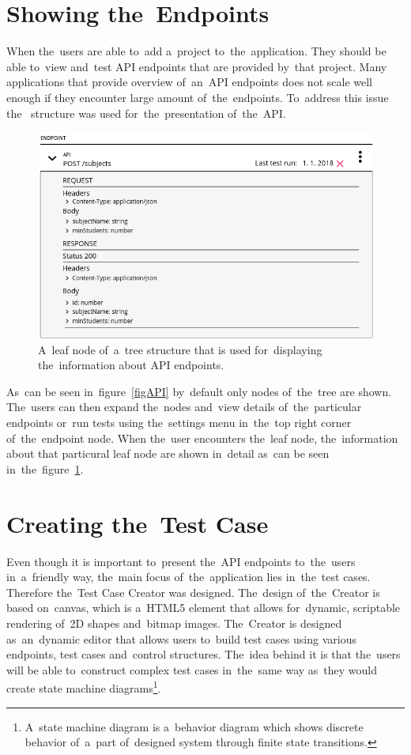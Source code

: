 \section{Showing the~Endpoints}
When the~users are able to~add a~project to~the~application. They should be able
to~view and~test API endpoints that are provided by~that project. Many
applications that provide overview of~an~API endpoints does not scale well
enough if they encounter large amount of~the~endpoints. To~address this issue
the~ structure was used for~the~presentation of~the~API.

\begin{figure}[!hbt]
	\centering
	\includegraphics[scale=0.62]{./designs/leafNode.png}
	\caption{A~leaf node of~a~tree structure that is used for~displaying
	the~information about API endpoints.}
	\label{figLeafNode}
\end{figure}

As~can be seen in~figure~\ref{figAPI} by~default only  nodes
of~the~tree are shown. The~users can then expand the~nodes and~view details
of~the~particular endpoints or~run tests using the~settings menu in~the~top
right corner of~the~endpoint node. When the~user encounters the~leaf node,
the~information about that particural leaf node are shown in~detail as~can be
seen in~the~figure~\ref{figLeafNode}. 

\section{Creating the~Test Case}
Even though it is important to~present the~API endpoints to~the~users
in~a~friendly way, the~main focus of~the~application lies in~the~test cases.
Therefore the~Test Case Creator was designed.
The~design of~the~Creator is based on~canvas, which is a~HTML5 element that
allows for~dynamic, scriptable rendering of~2D shapes and~bitmap images.
The~Creator is designed as~an~dynamic editor that allows users
to~build test cases using various endpoints, test cases and~control structures.
The~idea behind it is that the~users will be able to~construct complex test
cases in~the~same way as~they would create state machine
diagrams\footnote{A~state machine diagram is a~behavior diagram which shows
discrete behavior of~a~part of~designed system through finite state
transitions.}.

